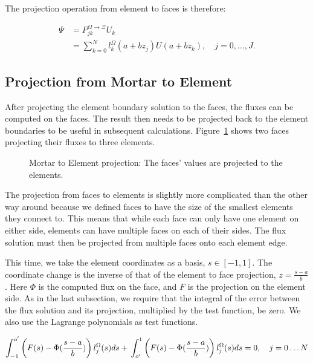 The projection operation from element to faces is therefore:

\begin{align}  \label{projection_element_to_face}
    \Psi &= P_{jk}^{\Omega \rightarrow \Xi} U_k  \\
    &= \sum_{k = 0}^{N}l_k ^ \Omega(a+ b z_j) U(a + b z_k), \quad j = 0, \ldots, J.
\end{align}

\subsection{Projection from Mortar to Element}\label{subsection:adaptive_mesh_refinement:mortar_element_method:mortar_to_element}

After projecting the element boundary solution to the faces, the fluxes can be computed on the
faces. The result then needs to be projected back to the element boundaries to be useful in
subsequent calculations. Figure~\ref{fig:mortar_to_element} shows two faces projecting their fluxes
to three elements.

\begin{figure}[H]
    \centering
    
    \caption{Mortar to Element projection: The faces' values are projected to the elements.}\label{fig:mortar_to_element}
\end{figure}

The projection from faces to elements is slightly more complicated than the
other way around because we defined faces to have the size of the smallest elements they connect to.
This means that while each face can only have one element on either side, elements can have multiple
faces on each of their sides. The flux solution must then be projected from multiple faces onto each
element edge.

This time, we take the element coordinates as a basis, \(s \in [-1, 1]\). The coordinate change is
the inverse of that of the element to face projection, \(z = \frac{s - a}{b}\). Here \(\Phi \) is
the computed flux on the face, and \(F\) is the projection on the element side. As in the last
subsection, we require that the integral of the error between the flux solution and its projection,
multiplied by the test function, be zero. We also use the Lagrange polynomials as test functions.

\begin{equation} \label{equ:zero_error_to_element}
    \int_{-1}^{o'} \left( F(s) - \Phi (\frac{s - a}{b}) \right) l_j^\Omega(s)ds + \\
    \int_{o'}^{1} \left( F(s) - \Phi (\frac{s - a}{b}) \right) l_j^\Omega (s)ds = 0, \\
    \quad j = 0 \ldots N
\end{equation}

